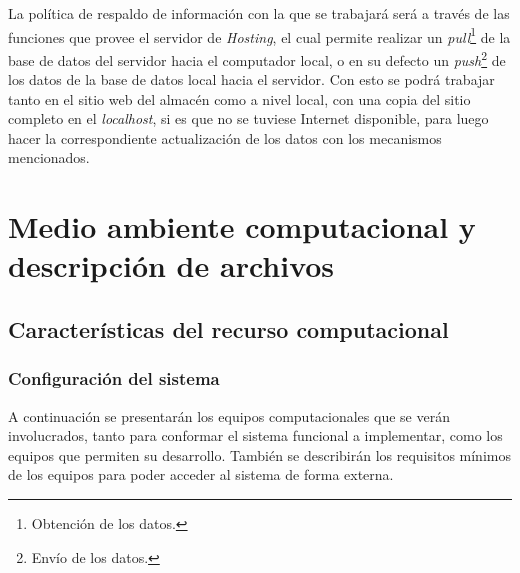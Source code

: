 \documentclass[letterpaper,12pt]{article}
\begin{document}
La política de respaldo de información con la que se trabajará será a través de las funciones que
provee el servidor de \emph{Hosting}, el cual permite realizar un \emph{pull}\footnote{Obtención de los datos.} de la 
base de datos del servidor hacia el computador local, o en su defecto un \emph{push}\footnote{Envío de los datos.} de los datos de la 
base de datos local hacia el servidor. Con esto se podrá trabajar tanto en el sitio 
web del almacén como a nivel local, con una copia del sitio completo en el \emph{localhost}, si es que no se tuviese Internet 
disponible, para luego hacer la correspondiente actualización de los datos con los mecanismos mencionados.

\newpage


\section{Medio ambiente computacional y descripción de archivos}

\subsection{Características del recurso computacional}

\subsubsection{Configuración del sistema}

A continuación se presentarán los equipos computacionales que se verán involucrados, tanto para 
conformar el sistema funcional a implementar, como los equipos que permiten su desarrollo. También 
se describirán los requisitos mínimos de los equipos para poder acceder al sistema de forma externa.
\end{document}
